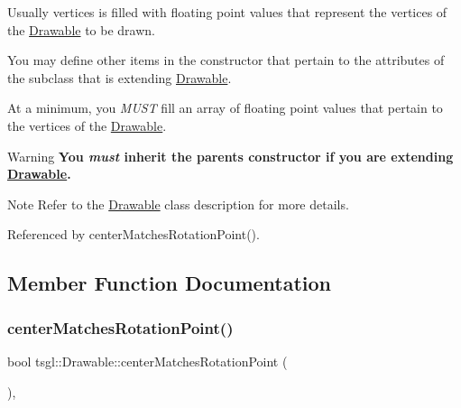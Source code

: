 \begin{DoxyItemize}
\item Usually {\ttfamily vertices} is filled with floating point values that represent the vertices of the \hyperlink{classtsgl_1_1_drawable}{Drawable} to be drawn.
\item You may define other items in the constructor that pertain to the attributes of the subclass that is extending \hyperlink{classtsgl_1_1_drawable}{Drawable}.
\item At a minimum, you {\itshape M\+U\+ST} fill an array of floating point values that pertain to the vertices of the \hyperlink{classtsgl_1_1_drawable}{Drawable}. \begin{DoxyWarning}{Warning}
{\bfseries You {\itshape must} inherit the parent\textquotesingle{}s constructor if you are extending \hyperlink{classtsgl_1_1_drawable}{Drawable}.} 
\end{DoxyWarning}
\begin{DoxyNote}{Note}
Refer to the \hyperlink{classtsgl_1_1_drawable}{Drawable} class description for more details. 
\end{DoxyNote}

\end{DoxyItemize}

Referenced by center\+Matches\+Rotation\+Point().



\subsection{Member Function Documentation}
\mbox{\label{classtsgl_1_1_drawable_a21c86457e72d4ce01309dff922e23ab5}} 
\subsubsection{\texorpdfstring{center\+Matches\+Rotation\+Point()}{centerMatchesRotationPoint()}}
{\footnotesize\ttfamily bool tsgl\+::\+Drawable\+::center\+Matches\+Rotation\+Point (\begin{DoxyParamCaption}{ }\end{DoxyParamCaption})\hspace{0.3cm}{\ttfamily [inline]}, {\ttfamily [protected]}}



